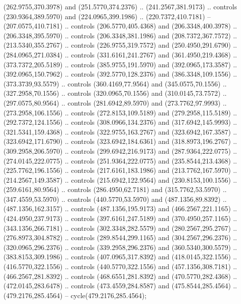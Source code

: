 {{\begin{scope}[y=-0.80pt,x=0.80pt,scale=0.04,yshift=187pt,xshift=-280pt]
      (262.9755,370.3978) and (251.5770,374.2376) .. (241.2567,381.9173) .. controls
      (230.9364,389.5970) and (224.0965,399.1986) .. (220.7372,410.7181) --
      (207.0575,410.7181) .. controls (206.5770,405.4368) and (206.3348,400.3978) ..
      (206.3348,395.5970) .. controls (206.3348,381.1986) and (208.7372,367.7572) ..
      (213.5340,355.2767) .. controls (226.9755,319.7572) and (250.4950,291.6790) ..
      (284.0965,271.0384) .. controls (331.6161,241.2767) and (361.4950,219.4368) ..
      (373.7372,205.5189) .. controls (385.9755,191.5970) and (392.0965,173.3587) ..
      (392.0965,150.7962) .. controls (392.5770,128.2376) and (386.3348,109.1556) ..
      (373.3739,93.5579) .. controls (360.4169,77.9564) and (345.0575,70.1556) ..
      (327.2958,70.1556) .. controls (320.0965,70.1556) and (310.0145,73.7572) ..
      (297.0575,80.9564) .. controls (281.6942,89.5970) and (273.7762,97.9993) ..
      (273.2958,106.1556) .. controls (272.8153,109.5189) and (279.2958,115.5189) ..
      (292.7372,124.1556) .. controls (308.0966,134.2376) and (317.6942,145.9993) ..
      (321.5341,159.4368) .. controls (322.9755,163.2767) and (323.6942,167.3587) ..
      (323.6942,171.6790) .. controls (323.6942,184.6361) and (318.8973,196.2767) ..
      (309.2958,206.5970) .. controls (299.6942,216.9173) and (287.9364,222.0775) ..
      (274.0145,222.0775) .. controls (251.9364,222.0775) and (235.8544,213.4368) ..
      (225.7762,196.1556) .. controls (217.6161,183.1986) and (213.7762,167.5970) ..
      (214.2567,149.3587) .. controls (215.6942,122.9564) and (230.8153,100.1556) ..
      (259.6161,80.9564) .. controls (286.4950,62.7181) and (315.7762,53.5970) ..
      (347.4559,53.5970) .. controls (440.5770,53.5970) and (487.1356,89.8392) ..
      (487.1356,162.3157) .. controls (487.1356,195.9173) and (466.2567,221.1165) ..
      (424.4950,237.9173) .. controls (397.6161,247.5189) and (370.4950,257.1165) ..
      (343.1356,266.7181) .. controls (302.3348,282.5579) and (280.2567,295.2767) ..
      (276.8973,304.8782) .. controls (289.8544,299.1165) and (304.2567,296.2376) ..
      (320.0965,296.2376) .. controls (339.2958,296.2376) and (360.5340,300.5579) ..
      (383.8153,309.1986) .. controls (407.0965,317.8392) and (418.0145,322.1556) ..
      (416.5770,322.1556) .. controls (440.5770,322.1556) and (457.1356,308.7181) ..
      (466.2567,281.8392) .. controls (468.6551,281.8392) and (470.5770,282.4368) ..
      (472.0145,283.6478) .. controls (473.4559,284.8587) and (475.8544,285.4564) ..
      (479.2176,285.4564) -- cycle(479.2176,285.4564);
    \end{scope}
}}
